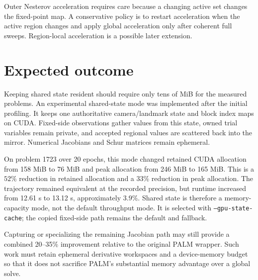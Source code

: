 \documentclass[11pt]{article}
\begin{document}
Outer Nesterov acceleration requires care because a changing active set changes
the fixed-point map.  A conservative policy is to restart acceleration when the
active region changes and apply global acceleration only after coherent full
sweeps.  Region-local acceleration is a possible later extension.

\section{Expected outcome}

Keeping shared state resident should require only tens of MiB for the measured
problems.  An experimental shared-state mode was implemented after the initial
profiling.  It keeps one authoritative camera/landmark state and block index
maps on CUDA.  Fixed-side observations gather values from this state, owned
trial variables remain private, and accepted regional values are scattered
back into the mirror.  Numerical Jacobians and Schur matrices remain ephemeral.

On problem 1723 over 20 epochs, this mode changed retained CUDA allocation from
158 MiB to 76 MiB and peak allocation from 246 MiB to 165 MiB.  This is a
$52\%$ reduction in retained allocation and a $33\%$ reduction in peak
allocation.  The trajectory remained equivalent at the recorded precision,
but runtime increased from 12.61 s to 13.12 s, approximately $3.9\%$.  Shared
state is therefore a memory-capacity mode, not the default throughput mode.
It is selected with \texttt{--gpu-state-cache}; the copied fixed-side path
remains the default and fallback.

Capturing or specializing the remaining Jacobian path may still provide a
combined 20--35\% improvement relative to the original PALM wrapper.  Such
work must retain ephemeral derivative workspaces and a device-memory budget so
that it does not sacrifice PALM's substantial memory advantage over a global
solve.
\end{document}
